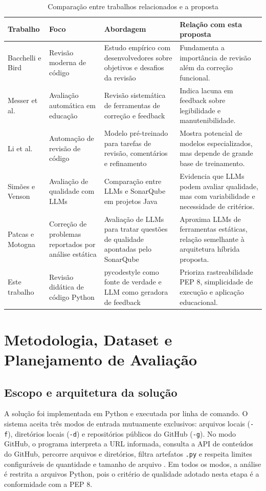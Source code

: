 \documentclass[12pt]{article}
\begin{document}
\begin{table}[ht]
\centering
\caption{Comparação entre trabalhos relacionados e a proposta}
\label{tab:trabalhos}
\small
\begin{tabular}{p{2.8cm}p{3.3cm}p{3.3cm}p{3.3cm}}
\toprule
\textbf{Trabalho} & \textbf{Foco} & \textbf{Abordagem} & \textbf{Relação com esta proposta}\\
\midrule
Bacchelli e Bird & Revisão moderna de código & Estudo empírico com desenvolvedores sobre objetivos e desafios da revisão & Fundamenta a importância de revisão além da correção funcional.\\
Messer et al. & Avaliação automática em educação & Revisão sistemática de ferramentas de correção e feedback & Indica lacuna em feedback sobre legibilidade e manutenibilidade.\\
Li et al. & Automação de revisão de código & Modelo pré-treinado para tarefas de revisão, comentários e refinamento & Mostra potencial de modelos especializados, mas depende de grande base de treinamento.\\
Simões e Venson & Avaliação de qualidade com LLMs & Comparação entre LLMs e SonarQube em projetos Java & Evidencia que LLMs podem avaliar qualidade, mas com variabilidade e necessidade de critérios.\\
Patcas e Motogna & Correção de problemas reportados por análise estática & Avaliação de LLMs para tratar questões de qualidade apontadas pelo SonarQube & Aproxima LLMs de ferramentas estáticas, relação semelhante à arquitetura híbrida proposta.\\
Este trabalho & Revisão didática de código Python & pycodestyle como fonte de verdade e LLM como geradora de feedback & Prioriza rastreabilidade PEP 8, simplicidade de execução e aplicação educacional.\\
\bottomrule
\end{tabular}
\end{table}

\section{Metodologia, Dataset e Planejamento de Avaliação}

\subsection{Escopo e arquitetura da solução}

A solução foi implementada em Python e executada por linha de comando. O sistema
aceita três modos de entrada mutuamente exclusivos: arquivos locais
(\texttt{-f}), diretórios locais (\texttt{-d}) e repositórios públicos do GitHub
(\texttt{-g}). No modo GitHub, o programa interpreta a URL informada, consulta a
API de conteúdos do GitHub, percorre arquivos e diretórios, filtra artefatos
\texttt{.py} e respeita limites configuráveis de quantidade e tamanho de arquivo
\cite{github2026contents}. Em todos os modos, a análise é restrita a arquivos
Python, pois o critério de qualidade adotado nesta etapa é a conformidade com a
PEP 8.
\end{document}

